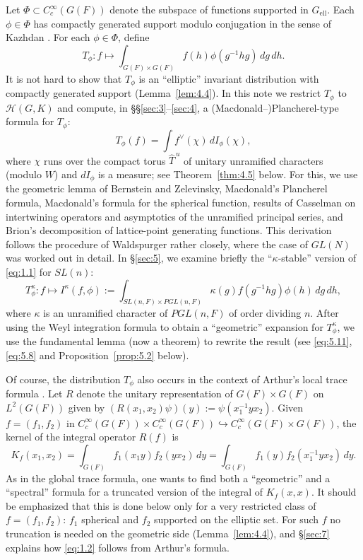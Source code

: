 \documentclass[12pt,letterpaper]{article}
\numberwithin{equation}{section}
\theoremstyle{plain}
\theoremstyle{remark}
\theoremstyle{plain}
\theoremstyle{definition}
\theoremstyle{remark}
\newcounter{rtw}
\theoremstyle{remark}
\newcommand{\Hc}{\mathcal{H}}
\newcommand{\Thu}{\widehat{T}^{\,u}}
\newcommand{\ellr}{\mathrm{ell}}
\begin{document}
Let $\Phi\subset C_c^\infty(G(F))$ denote the subspace of functions supported in $G_{\ellr}$. Each $\phi\in\Phi$ has compactly generated support modulo conjugation in the sense of Kazhdan \cite[\S4]{Ka86}. For each $\phi\in\Phi$, define
\begin{equation}\label{eq:1.1}
T_\phi: f\longmapsto \int_{G(F)\times G(F)} f(h)\phi(g^{-1}hg)\,dg\,dh.
\end{equation}
It is not hard to show that $T_\phi$ is an ``elliptic'' invariant distribution with compactly generated support (Lemma~\ref{lem:4.4}). In this note we restrict $T_\phi$ to $\Hc(G,K)$ and compute, in \S\S\ref{sec:3}--\ref{sec:4}, a (Macdonald--)Plancherel-type formula for $T_\phi$:
\begin{equation}\label{eq:1.2}
T_\phi(f)=\int f^\vee(\chi)\,dI_\phi(\chi),
\end{equation}
where $\chi$ runs over the compact torus $\Thu$ of unitary unramified characters (modulo $W$) and $dI_\phi$ is a measure; see Theorem~\ref{thm:4.5} below. For this, we use the geometric lemma of Bernstein and Zelevinsky, Macdonald's Plancherel formula, Macdonald's formula for the spherical function, results of Casselman on intertwining operators and asymptotics of the unramified principal series, and Brion's decomposition of lattice-point generating functions. This derivation follows the procedure of Waldspurger \cite{Wa89a} rather closely, where the case of $GL(N)$ was worked out in detail. In \S\ref{sec:5}, we examine briefly the ``$\kappa$-stable'' version of \eqref{eq:1.1} for $SL(n)$:
\begin{equation}\label{eq:1.3}
T^\kappa_\phi: f\longmapsto I^\kappa(f,\phi):=\int_{SL(n,F)\times PGL(n,F)}\kappa(g)f(g^{-1}hg)\phi(h)\,dg\,dh,
\end{equation}
where $\kappa$ is an unramified character of $PGL(n,F)$ of order dividing $n$. After using the Weyl integration formula to obtain a ``geometric'' expansion for $T^\kappa_\phi$, we use the fundamental lemma (now a theorem) to rewrite the result (see \eqref{eq:5.11}, \eqref{eq:5.8} and Proposition~\ref{prop:5.2} below).

Of course, the distribution $T_\phi$ also occurs in the context of Arthur's local trace formula \cite{Ar89,Ar91}. Let $R$ denote the unitary representation of $G(F)\times G(F)$ on $L^2(G(F))$ given by $(R(x_1,x_2)\psi)(y):=\psi(x_1^{-1}yx_2)$. Given $f=(f_1,f_2)$ in $C_c^\infty(G(F))\times C_c^\infty(G(F))\hookrightarrow C_c^\infty(G(F)\times G(F))$, the kernel of the integral operator $R(f)$ is
\begin{equation}\label{eq:1.4}
K_f(x_1,x_2)=\int_{G(F)}f_1(x_1y)f_2(yx_2)\,dy=\int_{G(F)}f_1(y)f_2(x_1^{-1}yx_2)\,dy.
\end{equation}
As in the global trace formula, one wants to find both a ``geometric'' and a ``spectral'' formula for a truncated version of the integral of $K_f(x,x)$. It should be emphasized that this is done below only for a very restricted class of $f=(f_1,f_2)$: $f_1$ spherical and $f_2$ supported on the elliptic set. For such $f$ no truncation is needed on the geometric side (Lemma~\ref{lem:4.4}), and \S\ref{sec:7} explains how \eqref{eq:1.2} follows from Arthur's formula.
\end{document}
